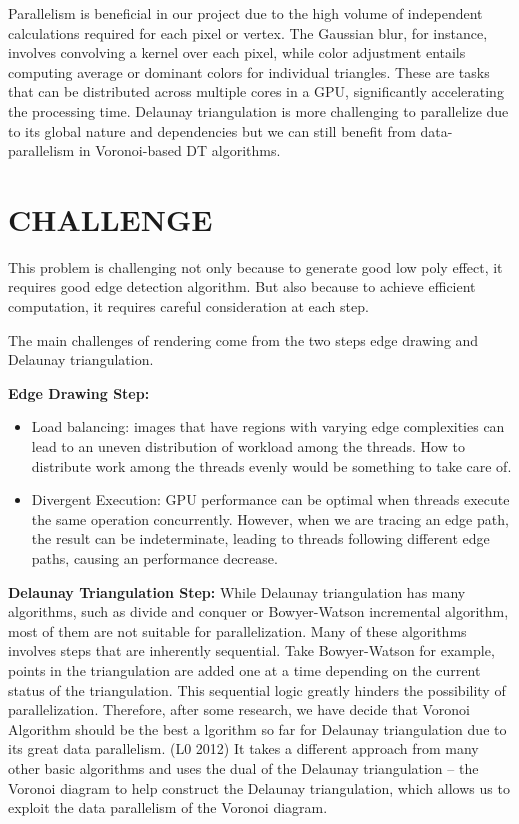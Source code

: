 \documentclass[12pt]{article}
\theoremstyle{definition}
\theoremstyle{plain}
\begin{document}
Parallelism is beneficial in our project due to the high volume of independent calculations required for each pixel or vertex. The Gaussian blur, for instance, involves convolving a kernel over each pixel, while color adjustment entails computing average or dominant colors for individual triangles. These are tasks that can be distributed across multiple cores in a GPU, significantly accelerating the processing time. Delaunay triangulation is more challenging to parallelize due to its global nature and dependencies but we can still benefit from data-parallelism in Voronoi-based DT algorithms.







\section{CHALLENGE}

This problem is challenging not only because to generate good low poly effect, it 
requires good edge detection
algorithm. But also because to achieve efficient computation, it requires careful 
consideration at each step. 

The main challenges of rendering come from the two steps edge drawing and Delaunay
triangulation.

{\bf Edge Drawing Step: }
\begin{itemize}
\item Load balancing: images that have regions with varying edge complexities can lead to an uneven distribution of workload among the threads. How to distribute work among the threads evenly would be something to take
care of. 
\item Divergent Execution: GPU performance can be optimal when threads execute the same operation concurrently.
However, when we are tracing an edge path, the result can be indeterminate, leading to threads following
different edge paths, causing an performance decrease. 
\end{itemize}

{\bf Delaunay Triangulation Step:} While Delaunay triangulation has many algorithms,
such as divide and conquer or Bowyer-Watson incremental algorithm, most of them are not
suitable for parallelization. Many of these algorithms involves steps that are 
inherently sequential. Take Bowyer-Watson for example, points in the triangulation are 
added one at a time depending on the current status of the triangulation. This 
sequential logic greatly hinders the possibility of parallelization. Therefore,
after some research, we have decide that Voronoi Algorithm should be the best a
lgorithm so far for Delaunay triangulation due to its great data parallelism. 
(L0 2012) It takes a different approach from many other basic algorithms and uses
the dual of the Delaunay triangulation -- the Voronoi diagram to help construct
the Delaunay triangulation, which allows us to exploit the data parallelism of
the Voronoi diagram. 
\end{document}
